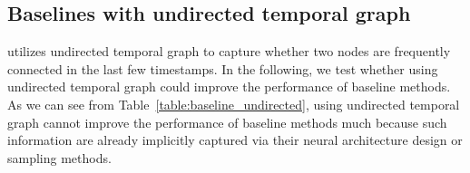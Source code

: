 



\subsection{Baselines with undirected temporal graph} \label{section:baseline_undirected}

\our utilizes undirected temporal graph to capture whether two nodes are frequently connected in the last few timestamps. In the following, we test whether using undirected temporal graph could improve the performance of baseline methods.
As we can see from Table~\ref{table:baseline_undirected}, using undirected temporal graph cannot improve the performance of baseline methods much because such information are already implicitly captured via their neural architecture design or sampling methods.

